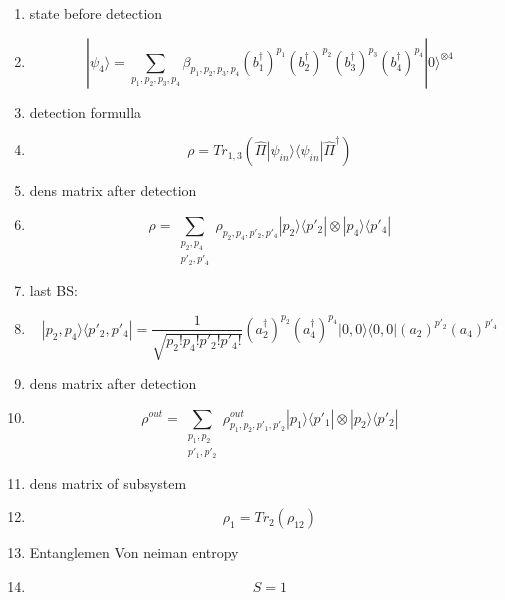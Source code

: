 \documentclass[12pt]{article}
\begin{document}
\begin{enumerate}
\item state before detection

\item $$ |\psi_4\rangle = \sum_{p_{1},p_{2},p_{3},p_{4}} \beta_{p_{1},p_{2},p_{3},p_{4}} (b_{1}^{\dag})^{p_{1}}  (b_{2}^{\dag})^{p_{2}} (b_{3}^{\dag})^{p_{3}}  (b_{4}^{\dag})^{p_{4}} |0\rangle^{\otimes 4} $$

\item detection formulla

\item $$  \rho =  Tr_{1,3}(\hat{\Pi} |\psi_{in}\rangle \langle \psi_{in}|   \hat{\Pi}^{\dag}) $$


\item dens matrix after detection

\item $$ \rho = \sum_{\substack{p_{2},p_{4} \\ p'_{2}, p'_{4}}}  \rho_{p_{2},p_{4}, p'_{2}, p'_{4}} |p_{2}\rangle \langle p'_{2}| \otimes |p_{4}\rangle \langle p'_{4}| $$

\item last BS:

\item $$   |p_{2},p_{4}\rangle \langle p'_{2},p'_{4}| = \frac{1}{\sqrt{p_{2}!p_{4}!p'_{2}!p'_{4}!}} (a_{2}^{\dag})^{p_{2}} (a_{4}^{\dag})^{p_{4}} |0,0\rangle \langle 0,0| (a_{2})^{p'_{2}} (a_{4})^{p'_{4}}   $$


\item dens matrix after detection

\item $$ \rho^{out} = \sum_{\substack{p_{1},p_{2} \\ p'_{1}, p'_{2}}}  \rho^{out}_{p_{1},p_{2}, p'_{1}, p'_{2}} |p_{1}\rangle \langle p'_{1}| \otimes |p_{2}\rangle \langle p'_{2}| $$

\item dens matrix of subsystem

\item $$ \rho_{1} = Tr_{2}(\rho_{12}) $$

\item Entanglemen Von neiman entropy

\item $$ S = 1 $$


\end{enumerate}
\end{document}
